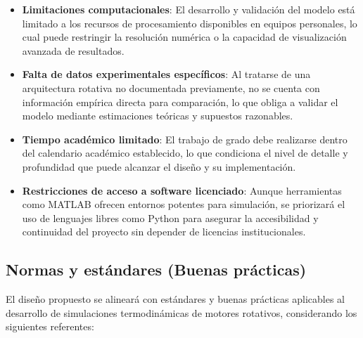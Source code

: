 \documentclass{LS}
\begin{document}
\begin{itemize}
    \item \textbf{Limitaciones computacionales}: El desarrollo y validación del modelo está limitado a los recursos de procesamiento disponibles en equipos personales, lo cual puede restringir la resolución numérica o la capacidad de visualización avanzada de resultados.
    
    \item \textbf{Falta de datos experimentales específicos}: Al tratarse de una arquitectura rotativa no documentada previamente, no se cuenta con información empírica directa para comparación, lo que obliga a validar el modelo mediante estimaciones teóricas y supuestos razonables.
    
    \item \textbf{Tiempo académico limitado}: El trabajo de grado debe realizarse dentro del calendario académico establecido, lo que condiciona el nivel de detalle y profundidad que puede alcanzar el diseño y su implementación.
    
    \item \textbf{Restricciones de acceso a software licenciado}: Aunque herramientas como MATLAB ofrecen entornos potentes para simulación, se priorizará el uso de lenguajes libres como Python para asegurar la accesibilidad y continuidad del proyecto sin depender de licencias institucionales.
\end{itemize}

\subsection{Normas y estándares (Buenas prácticas)}

El diseño propuesto se alineará con estándares y buenas prácticas aplicables al desarrollo de simulaciones termodinámicas de motores rotativos, considerando los siguientes referentes:
\end{document}
